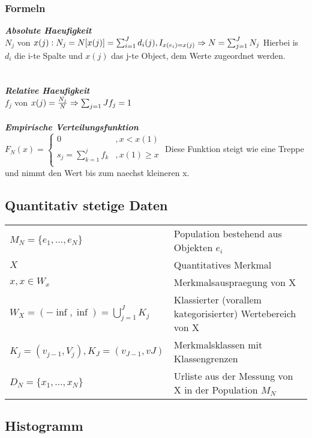 \documentclass{article}
\newcommand{\gap}{\\ \ \\}
\newcommand{\headline}[1]{\textbf{\textit{#1}}\\}
\begin{document}
\subsubsection{Formeln}
\headline{Absolute Haeufigkeit}
$
N_j$ von $x(j):\\
N_j = N[x(j)] = \sum_{i=1}^J d_i(j), I_{x(e_i)=x(j)}\\
\Rightarrow N = \sum_{j=1}^J N_j\\
$
Hierbei is $d_i$ die i-te Spalte und $x(j)$ das j-te Object, dem Werte zugeordnet werden.\\
\gap
\headline{Relative Haeufigkeit}
$
f_j$ von $x(j) = \frac{N_j}{N}\\
\Rightarrow \sum_{j=1}{J} f_j= 1\\
$
\gap
\headline{Empirische Verteilungsfunktion}
$
F_N(x) = \begin{cases}
    0 & , x < x(1)\\
    s_j = \sum_{k=1}^j f_k & , x(1) \geq x\\
\end{cases}
$
Diese Funktion steigt wie eine Treppe und nimmt den Wert bis zum naechst kleineren x.\\
\subsection{Quantitativ stetige Daten}
\begin{tabular}{ll}
    $M_N =\{e_1, ..., e_N\}$                &Population bestehend aus Objekten $e_i$\\
    $X$                                     &Quantitatives Merkmal\\
    $x,x \in W_x$                           &Merkmalsauspraegung von X\\
    $W_X = (-\inf,\inf) = \bigcup_{j=1}^J K_j$ &Klassierter (vorallem kategorisierter) Wertebereich von X\\
    $K_j = (v_{j-1},V_j), K_J=(v_{J-1},v{J})$ &Merkmalsklassen mit Klassengrenzen\\
    $D_N = \{x_1,...,x_N\}$                 &Urliste aus der Messung von X in der Population $M_N$\\
\end{tabular}
\subsection{Histogramm}
\end{document}
